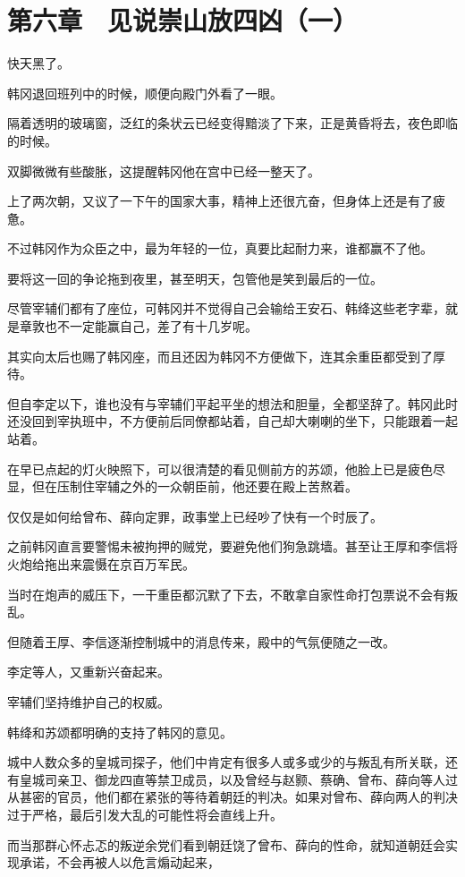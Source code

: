 \section{第六章　见说崇山放四凶（一）}

快天黑了。

韩冈退回班列中的时候，顺便向殿门外看了一眼。

隔着透明的玻璃窗，泛红的条状云已经变得黯淡了下来，正是黄昏将去，夜色即临的时候。

双脚微微有些酸胀，这提醒韩冈他在宫中已经一整天了。

上了两次朝，又议了一下午的国家大事，精神上还很亢奋，但身体上还是有了疲惫。

不过韩冈作为众臣之中，最为年轻的一位，真要比起耐力来，谁都赢不了他。

要将这一回的争论拖到夜里，甚至明天，包管他是笑到最后的一位。

尽管宰辅们都有了座位，可韩冈并不觉得自己会输给王安石、韩绛这些老字辈，就是章敦也不一定能赢自己，差了有十几岁呢。

其实向太后也赐了韩冈座，而且还因为韩冈不方便做下，连其余重臣都受到了厚待。

但自李定以下，谁也没有与宰辅们平起平坐的想法和胆量，全都坚辞了。韩冈此时还没回到宰执班中，不方便前后同僚都站着，自己却大喇喇的坐下，只能跟着一起站着。

在早已点起的灯火映照下，可以很清楚的看见侧前方的苏颂，他脸上已是疲色尽显，但在压制住宰辅之外的一众朝臣前，他还要在殿上苦熬着。

仅仅是如何给曾布、薛向定罪，政事堂上已经吵了快有一个时辰了。

之前韩冈直言要警惕未被拘押的贼党，要避免他们狗急跳墙。甚至让王厚和李信将火炮给拖出来震慑在京百万军民。

当时在炮声的威压下，一干重臣都沉默了下去，不敢拿自家性命打包票说不会有叛乱。

但随着王厚、李信逐渐控制城中的消息传来，殿中的气氛便随之一改。

李定等人，又重新兴奋起来。

宰辅们坚持维护自己的权威。

韩绛和苏颂都明确的支持了韩冈的意见。

城中人数众多的皇城司探子，他们中肯定有很多人或多或少的与叛乱有所关联，还有皇城司亲卫、御龙四直等禁卫成员，以及曾经与赵颢、蔡确、曾布、薛向等人过从甚密的官员，他们都在紧张的等待着朝廷的判决。如果对曾布、薛向两人的判决过于严格，最后引发大乱的可能性将会直线上升。

而当那群心怀忐忑的叛逆余党们看到朝廷饶了曾布、薛向的性命，就知道朝廷会实现承诺，不会再被人以危言煽动起来，

